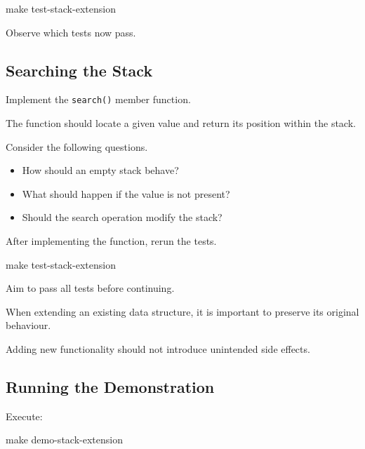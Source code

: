 \documentclass{csc2059practical}
\begin{document}
\begin{terminal}
make test-stack-extension
\end{terminal}

Observe which tests now pass.

\subsection*{Searching the Stack}

Implement the \texttt{search()} member function.

The function should locate a given value and return its position within
the stack.

Consider the following questions.

\begin{itemize}

\item How should an empty stack behave?

\item What should happen if the value is not present?

\item Should the search operation modify the stack?

\end{itemize}

After implementing the function, rerun the tests.

\begin{terminal}
make test-stack-extension
\end{terminal}

Aim to pass all tests before continuing.

\clearpage

\begin{tipbox}

When extending an existing data structure, it is important to preserve
its original behaviour.

Adding new functionality should not introduce unintended side effects.

\end{tipbox}

\subsection*{Running the Demonstration}

Execute:

\begin{terminal}
make demo-stack-extension
\end{terminal}
\end{document}
